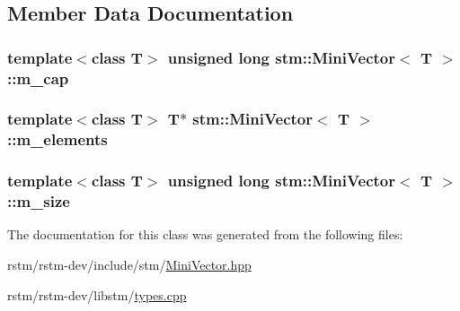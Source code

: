 \subsection{Member Data Documentation}
\hypertarget{classstm_1_1MiniVector_a4bd8f8e389faa9a5bb09021a442b7ccc}{
\subsubsection[{m\-\_\-cap}]{\setlength{\rightskip}{0pt plus 5cm}template$<$class T$>$ unsigned long {\bf stm\-::\-Mini\-Vector}$<$ T $>$\-::m\-\_\-cap\hspace{0.3cm}{\ttfamily [private]}}}\label{classstm_1_1MiniVector_a4bd8f8e389faa9a5bb09021a442b7ccc}
\hypertarget{classstm_1_1MiniVector_a0b43a284b4391e435e97aad1b4706c96}{
\subsubsection[{m\-\_\-elements}]{\setlength{\rightskip}{0pt plus 5cm}template$<$class T$>$ T$\ast$ {\bf stm\-::\-Mini\-Vector}$<$ T $>$\-::m\-\_\-elements\hspace{0.3cm}{\ttfamily [private]}}}\label{classstm_1_1MiniVector_a0b43a284b4391e435e97aad1b4706c96}
\hypertarget{classstm_1_1MiniVector_a8dfe53c19634a322f594d5a09f591a1c}{
\subsubsection[{m\-\_\-size}]{\setlength{\rightskip}{0pt plus 5cm}template$<$class T$>$ unsigned long {\bf stm\-::\-Mini\-Vector}$<$ T $>$\-::m\-\_\-size\hspace{0.3cm}{\ttfamily [private]}}}\label{classstm_1_1MiniVector_a8dfe53c19634a322f594d5a09f591a1c}


The documentation for this class was generated from the following files\-:\begin{DoxyCompactItemize}
\item 
rstm/rstm-\/dev/include/stm/\hyperlink{MiniVector_8hpp}{Mini\-Vector.\-hpp}\item 
rstm/rstm-\/dev/libstm/\hyperlink{types_8cpp}{types.\-cpp}\end{DoxyCompactItemize}
